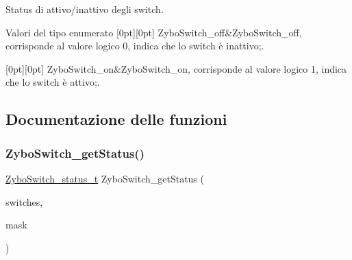 Status di attivo/inattivo degli switch. 

\begin{DoxyEnumFields}{Valori del tipo enumerato}
[0pt][0pt]{}\mbox{\label{group___switch_gga4ba6b49b2f47ebb464aefcea7e23e04aa1d686faf83e8606e68eec0b7e525a755}} 
Zybo\+Switch\+\_\+off&Zybo\+Switch\+\_\+off, corrisponde al valore logico \textquotesingle{}0\textquotesingle{}, indica che lo switch è inattivo;. \\
\hline

[0pt][0pt]{}\mbox{\label{group___switch_gga4ba6b49b2f47ebb464aefcea7e23e04aafba009508b8822de867af69034e3e4f8}} 
Zybo\+Switch\+\_\+on&Zybo\+Switch\+\_\+on, corrisponde al valore logico \textquotesingle{}1\textquotesingle{}, indica che lo switch è attivo;. \\
\hline

\end{DoxyEnumFields}


\subsection{Documentazione delle funzioni}
\mbox{\label{group___switch_gafac8daf9a9a585f8f20ef2a6fa883a1f}} 
\subsubsection{\texorpdfstring{Zybo\+Switch\+\_\+get\+Status()}{ZyboSwitch\_getStatus()}}
{\footnotesize\ttfamily \hyperlink{group___switch_ga4ba6b49b2f47ebb464aefcea7e23e04a}{Zybo\+Switch\+\_\+status\+\_\+t} Zybo\+Switch\+\_\+get\+Status (\begin{DoxyParamCaption}\item[{\hyperlink{struct_zybo_switch__t}{Zybo\+Switch\+\_\+t} $\ast$}]{switches,  }\item[{\hyperlink{group___switch_ga2e0602a824354f25c395f938caba3703}{Zybo\+Switch\+\_\+mask\+\_\+t}}]{mask }\end{DoxyParamCaption})}



